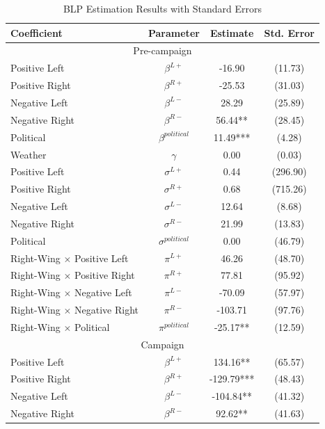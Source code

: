 \documentclass[12pt]{article}
\begin{document}
\begin{table}[!htbp]
	\caption{BLP Estimation Results with Standard Errors}
	\label{tab:results_blp}
	\centering
	\begin{threeparttable}
		\begin{tabular}{lccc}
			\hline
			\textbf{Coefficient} & \textbf{Parameter} & \textbf{Estimate} & \textbf{Std. Error} \\
			\hline
			\multicolumn{4}{c}{Pre-campaign} \\
			\hline
			\hline
			Positive Left & $\beta^{L+}$ & -16.90 & (11.73) \\
			Positive Right & $\beta^{R+}$ & -25.53 & (31.03) \\
			Negative Left & $\beta^{L-}$ & 28.29 & (25.89) \\
			Negative Right & $\beta^{R-}$ & 56.44** & (28.45) \\
			Political & $\beta^{political}$ & 11.49*** & (4.28) \\
			Weather & $\gamma$ & 0.00 & (0.03) \\
			\hline
			Positive Left & $\sigma^{L+}$ & 0.44 & (296.90) \\
			Positive Right & $\sigma^{R+}$ & 0.68 & (715.26) \\
			Negative Left & $\sigma^{L-}$ & 12.64 & (8.68) \\
			Negative Right & $\sigma^{R-}$ & 21.99 & (13.83) \\
			Political & $\sigma^{political}$ & 0.00 & (46.79) \\
			\hline
			Right-Wing $\times$  Positive Left & $\pi^{L+}$ & 46.26 & (48.70) \\
			Right-Wing $\times$  Positive Right & $\pi^{R+}$ & 77.81 & (95.92) \\
			Right-Wing $\times$  Negative Left & $\pi^{L-}$ & -70.09 & (57.97) \\
			Right-Wing $\times$  Negative Right & $\pi^{R-}$ & -103.71 & (97.76) \\
			Right-Wing $\times$  Political & $\pi^{political}$ & -25.17** & (12.59) \\
			\hline
			\hline
			\multicolumn{4}{c}{Campaign} \\
			\hline
			\hline
			Positive Left & $\beta^{L+}$ & 134.16** & (65.57) \\
			Positive Right & $\beta^{R+}$ & -129.79*** & (48.43) \\
			Negative Left & $\beta^{L-}$ & -104.84** & (41.32) \\
			Negative Right & $\beta^{R-}$ & 92.62** & (41.63) \\

\end{tabular}
\end{threeparttable}
\end{table}
\end{document}
